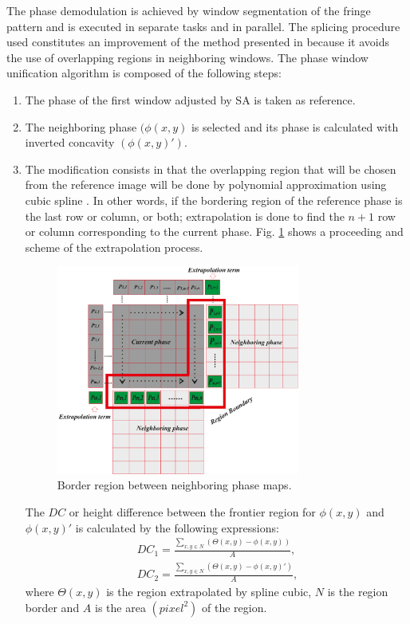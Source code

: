 \documentclass[review]{elsarticle}
\begin{document}
The phase demodulation is achieved by window segmentation of the fringe pattern and is executed in separate tasks and in parallel. The splicing procedure used constitutes an improvement of the method presented in \cite{Toledo2008} because it avoids the use of overlapping regions in neighboring windows. The phase window unification algorithm is composed of the following steps:
\begin{enumerate}
	\item The phase of the first window adjusted by SA is taken as reference.
	\item The neighboring phase $(\phi(x,y)$ is selected and its phase is calculated with inverted concavity $(\phi(x,y)')$. 
	\item The modification consists in that the overlapping region that will be chosen from the reference image will be done by polynomial approximation using cubic spline \cite{burden2002analisis}. In other words, if the bordering region of the reference phase is the last row or column, or both; extrapolation is done to find the $n + 1$ row or column corresponding to the current phase. Fig. \ref{Fig3} shows a proceeding and scheme of the extrapolation process.
		\begin{figure}[ht]
		\centering
		\includegraphics[width=8cm]{fig3}
		\caption{Border region between neighboring phase maps.}
		\label{Fig3}
	\end{figure}
The $DC$ or height difference between the frontier region for $\phi(x,y)$ and $\phi(x,y)'$ is calculated by the following expressions:
	\begin{eqnarray}\label{eq7}
	DC_1= \frac{\sum_{x,y\in N}(\varTheta(x,y) -\phi(x,y))}{A} \text{,}\nonumber \\
	DC_2= \frac{\sum_{x,y\in N}(\varTheta(x,y) -\phi(x,y)')}{A} \text{,} 
	\end{eqnarray}
	where $\varTheta(x,y)$ is the region extrapolated by spline cubic, $N$ is the region border and $A$ is the area $(pixel^2)$ of the region.	

\end{enumerate}
\end{document}
